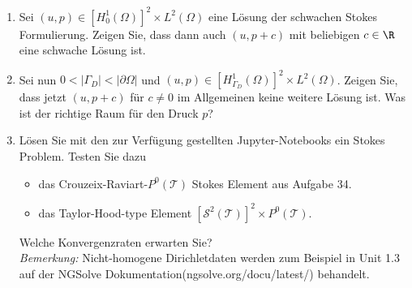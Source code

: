 
\begin{exercise}

\phantom{}

\begin{enumerate}[label = \textbf{\alph*)}]
  \item Sei $(u,p) \in [H_0^1(\Omega)]^2 \times L^2(\Omega)$ eine Lösung der
  schwachen Stokes Formulierung. Zeigen Sie, dass dann auch $(u, p + c)$ mit
  beliebigen $c \in \R$ eine schwache Lösung ist.
  \item Sei nun $0 < |\Gamma_D| < |\partial\Omega|$ und
  $(u,p) \in [H_{\Gamma_D}^1(\Omega)]^2 \times L^2(\Omega)$. Zeigen Sie, dass
  jetzt $(u, p + c)$ für $c \neq 0$ im Allgemeinen keine weitere Lösung ist.
  Was ist der richtige Raum für den Druck $p$?
  \item Lösen Sie mit den zur Verfügung gestellten Jupyter-Notebooks ein
  Stokes Problem. Testen Sie dazu
  \begin{itemize}
    \item das Crouzeix-Raviart-$P^0(\mathcal{T})$ Stokes Element aus Aufgabe 34.
    \item das Taylor-Hood-type Element $[\mathcal{S}^2(\mathcal{T})]^2 \times P^0(\mathcal{T})$.
  \end{itemize}
  Welche Konvergenzraten erwarten Sie? \\
  \textit{Bemerkung:} Nicht-homogene Dirichletdaten werden zum Beispiel in
  Unit 1.3 auf der NGSolve Dokumentation(ngsolve.org/docu/latest/) behandelt.
\end{enumerate}

\end{exercise}


\begin{solution}

\phantom{}


\end{solution}

